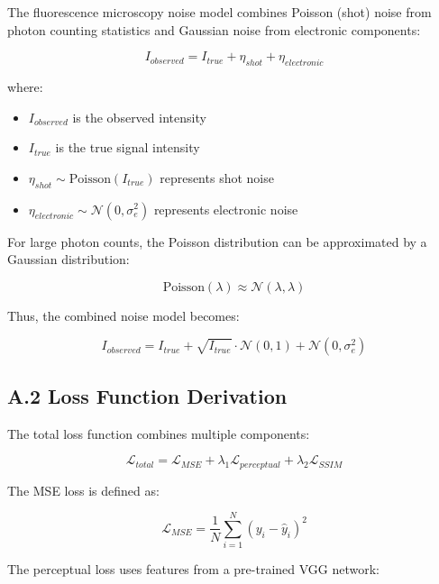 \documentclass[12pt,a4paper]{report}
\begin{document}
The fluorescence microscopy noise model combines Poisson (shot) noise from photon counting statistics and Gaussian noise from electronic components:

\begin{equation}
I_{observed} = I_{true} + \eta_{shot} + \eta_{electronic}
\end{equation}

where:
\begin{itemize}
    \item $I_{observed}$ is the observed intensity
    \item $I_{true}$ is the true signal intensity
    \item $\eta_{shot} \sim \text{Poisson}(I_{true})$ represents shot noise
    \item $\eta_{electronic} \sim \mathcal{N}(0, \sigma_e^2)$ represents electronic noise
\end{itemize}

For large photon counts, the Poisson distribution can be approximated by a Gaussian distribution:

\begin{equation}
\text{Poisson}(\lambda) \approx \mathcal{N}(\lambda, \lambda)
\end{equation}

Thus, the combined noise model becomes:

\begin{equation}
I_{observed} = I_{true} + \sqrt{I_{true}} \cdot \mathcal{N}(0, 1) + \mathcal{N}(0, \sigma_e^2)
\end{equation}

\subsection*{A.2 Loss Function Derivation}

The total loss function combines multiple components:

\begin{equation}
\mathcal{L}_{total} = \mathcal{L}_{MSE} + \lambda_1 \mathcal{L}_{perceptual} + \lambda_2 \mathcal{L}_{SSIM}
\end{equation}

The MSE loss is defined as:

\begin{equation}
\mathcal{L}_{MSE} = \frac{1}{N}\sum_{i=1}^{N}(y_i - \hat{y}_i)^2
\end{equation}

The perceptual loss uses features from a pre-trained VGG network:
\end{document}
